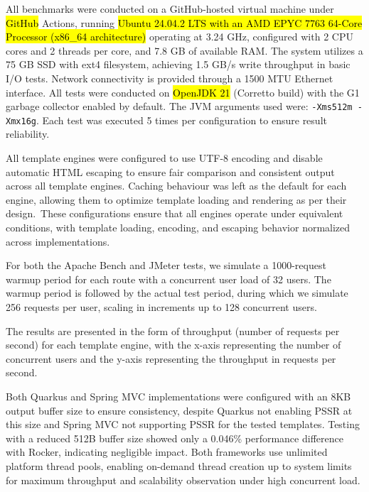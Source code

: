 \documentclass[software,article,accept,pdftex,moreauthors]{Definitions/mdpi}
\begin{document}
All benchmarks were conducted on a GitHub-hosted virtual machine under \hl{GitHub} %
Actions, running \hl{Ubuntu 24.04.2 LTS with an AMD EPYC 7763 64-Core Processor
(x86\_64 architecture)} %
 operating at 3.24 GHz, configured with 2 CPU cores and 2
threads per core, and 7.8 GB of available RAM. The system utilizes a 75 GB SSD
with ext4 filesystem, achieving 1.5 GB/s write throughput in basic I/O tests.
Network connectivity is provided through a 1500 MTU Ethernet interface. All
tests were conducted on \hl{OpenJDK 21} (Corretto build) with the G1 garbage
collector enabled by default. The JVM arguments used were: \texttt{-Xms512m
     -Xmx16g}. Each test was executed 5 times per configuration to ensure result
reliability.

All template engines were configured to use UTF-8 encoding and disable
automatic HTML escaping to ensure fair comparison and consistent output across
all template engines. Caching behaviour was left as the default for each
engine, allowing them to optimize template loading and rendering as per their
design.~These configurations ensure that all engines operate under equivalent
conditions, with template loading, encoding, and escaping behavior normalized
across implementations.

For both the Apache Bench and JMeter tests, we simulate a 1000-request warmup
period for each route with a concurrent user load of 32 users. The warmup
period is followed by the actual test period, during which we simulate 256
requests per user, scaling in increments up to 128 concurrent users.

The results are presented in the form of throughput (number of requests per
second) for each template engine, with the x-axis representing the number of
concurrent users and the y-axis representing the throughput in requests per
second.

Both Quarkus and Spring MVC implementations were configured with an 8KB output
buffer size to ensure consistency, despite Quarkus not enabling PSSR at this
size and Spring MVC not supporting PSSR for the tested templates. Testing with
a reduced 512B buffer size showed only a 0.046\% performance difference with
Rocker, indicating negligible impact. Both frameworks use unlimited platform
thread pools, enabling on-demand thread creation up to system limits for
maximum throughput and scalability observation under high concurrent load.
\end{document}
